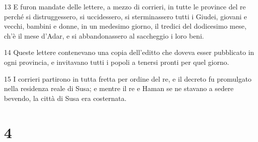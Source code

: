 \par 13 E furon mandate delle lettere, a mezzo di corrieri, in tutte le province del re perché si distruggessero, si uccidessero, si sterminassero tutti i Giudei, giovani e vecchi, bambini e donne, in un medesimo giorno, il tredici del dodicesimo mese, ch'è il mese d'Adar, e si abbandonassero al saccheggio i loro beni.
\par 14 Queste lettere contenevano una copia dell'editto che doveva esser pubblicato in ogni provincia, e invitavano tutti i popoli a tenersi pronti per quel giorno.
\par 15 I corrieri partirono in tutta fretta per ordine del re, e il decreto fu promulgato nella residenza reale di Susa; e mentre il re e Haman se ne stavano a sedere bevendo, la città di Susa era costernata.

\chapter{4}


